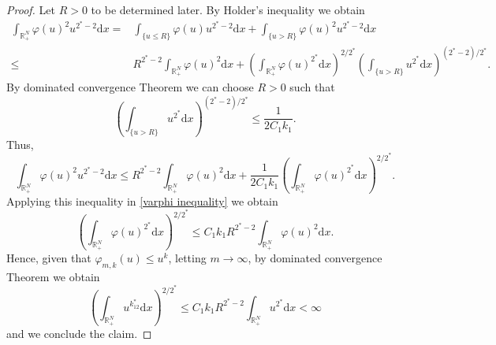 \documentclass[12pt,reqno]{amsart}
\begin{document}
\begin{proof}
Let $R>0$ to be determined later. By Holder's inequality we obtain
\begin{align*}
    \int_{\mathds{R}^N_+}\varphi(u)^2u^{2^\ast-2}\mathrm{d}x=&\int_{\{u\leq R\}}\varphi(u)u^{2^\ast-2}\mathrm{d}x+\int_{\{u>R\}}\varphi(u)^2u^{2^\ast-2}\mathrm{d}x\\
    \leq& R^{2^\ast-2}\int_{\mathds{R}^N_+}\varphi(u)^2\mathrm{d}x+\left(\int_{\mathds{R}^N_+}\varphi(u)^{2^\ast}\mathrm{d}x\right)^{2/2^\ast}\left(\int_{\{u>R\}}u^{2^\ast}\mathrm{d}x\right)^{(2^\ast-2)/2^\ast}.
\end{align*}
By dominated convergence Theorem we can choose $R>0$ such that 
\begin{equation*}
    \left(\int_{\{u>R\}}u^{2^\ast}\mathrm{d}x\right)^{(2^\ast-2)/2^\ast} \leq \frac{1}{2C_1k_1}.
\end{equation*}
Thus,
\begin{equation*}
    \int_{\mathds{R}^N_+}\varphi(u)^2u^{2^\ast-2}\mathrm{d}x\leq R^{2^\ast-2}\int_{\mathds{R}^N_+}\varphi(u)^2\mathrm{d}x+\frac{1}{2C_1k_1}\left(\int_{\mathds{R}^N_+}\varphi(u)^{2^\ast}\mathrm{d}x\right)^{2/2^\ast}.
\end{equation*}
Applying this inequality in \eqref{varphi inequality} we obtain
\begin{equation*}
    \left(\int_{\mathds{R}^N_+}\varphi(u)^{2^\ast}\mathrm{d}x\right)^{2/2^\ast}\leq C_1k_1 R^{2^\ast-2}\int_{\mathds{R}^N_+}\varphi(u)^2\mathrm{d}x.
\end{equation*}
Hence, given that $\varphi_{m,k}(u)\leq u^{k}$, letting $m\longrightarrow\infty$, by dominated convergence Theorem we obtain
\begin{equation*}
     \left(\int_{\mathds{R}^N_+}u^{k_12^\ast}\mathrm{d}x\right)^{2/2^\ast} \leq C_1k_1R^{2^\ast-2}\int_{\mathds{R}^N_+}u^{2^\ast}\mathrm{d}x<\infty
\end{equation*}
and we conclude the claim.


\end{proof}
\end{document}
